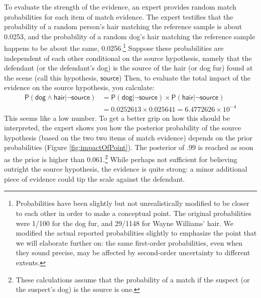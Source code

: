 \documentclass[
  10pt,
  dvipsnames,enabledeprecatedfontcommands]{scrartcl}
\newcommand{\pr}[1]{\mathsf{P}(#1)}
\newcommand{\s}[1]{\mbox{$\mathsf{#1}$}}
\begin{document}
To evaluate the strength of the evidence, an expert provides random
match probabilities for each item of match evidence. The expert
testifies that the probability of a random person's hair matching the
reference sample is about 0.0253, and the probability of a random dog's
hair matching the reference sample happens to be about the same,
0.0256.\footnote{Probabilities have been slightly but not
  unrealistically modified to be closer to each other in order to make a
  conceptual point. The original probabilities were 1/100 for the dog
  fur, and 29/1148 for Wayne Williams' hair. We modified the actual
  reported probabilities slightly to emphasize the point that we will
  elaborate further on: the same first-order probabilities, even when
  they sound precise, may be affected by second-order uncertainty to
  different extents.} Suppose these probabilities are independent of
each other conditional on the source hypothesis, namely that the
defendant (or the defendant's dog) is the source of the hair (or dog
fur) found at the scene (call this hypothesis, \(\mathsf{source}\))
Then, to evaluate the total impact of the evidence on the source
hypothesis, you calculate: \begin{align*}
\pr{\s{dog}\wedge \s{hair} \vert \neg \s{source}} & = \pr{\s{dog} \vert \neg \s{source}} \times \pr{\s{hair} \vert \neg \s{source}} \\
& =  0.0252613 \times  0.025641 = \ensuremath{6.4772626\times 10^{-4}}
\end{align*} This seems like a low number. To get a better grip on how
this should be interpreted, the expert shows you how the posterior
probability of the source hypothesis (based on the two two items of
match evidence) depends on the prior probabilities (Figure
\ref{fig:impactOfPoint}). The posterior of .99 is reached as soon as the
prior is higher than 0.061.\footnote{These calculations assume that the
  probability of a match if the suspect (or the suspect's dog) is the
  source is one.} While perhaps not sufficient for believing outright
the source hypothesis, the evidence is quite strong: a minor additional
piece of evidence could tip the scale against the defendant.
\end{document}
